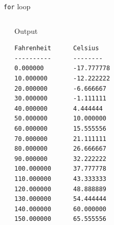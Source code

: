 \documentclass[usenames,dvipsnames,aspectratio=169]{beamer}
\begin{document}
\begin{frame}[fragile]{\texttt{for} loop}
  \begin{columns}[T]
      \begin{exampleblock}{}
        \scriptsize
        \vspace{-.3cm}
        
        \vspace{-.3cm}
      \end{exampleblock}
      \begin{block}{Output}
        \scriptsize
        \begin{verbatim}
Fahrenheit      Celsius
----------      --------
0.000000        -17.777778
10.000000       -12.222222
20.000000       -6.666667
30.000000       -1.111111
40.000000       4.444444
50.000000       10.000000
60.000000       15.555556
70.000000       21.111111
80.000000       26.666667
90.000000       32.222222
100.000000      37.777778
110.000000      43.333333
120.000000      48.888889
130.000000      54.444444
140.000000      60.000000
150.000000      65.555556
\end{verbatim}
      \end{block}
  \end{columns}
\end{frame}
\end{document}
